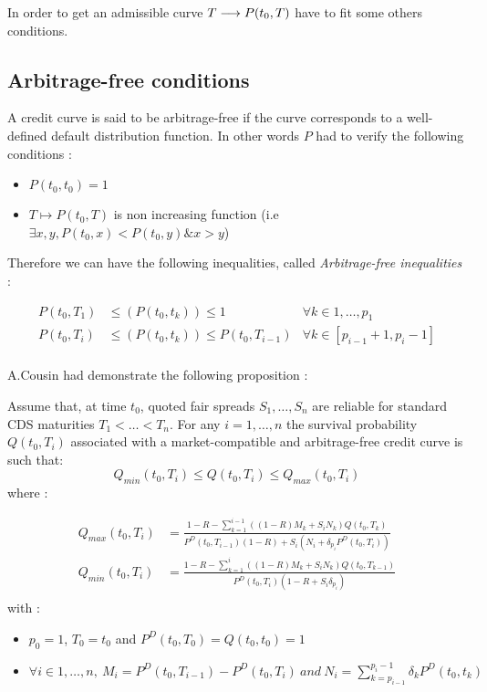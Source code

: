 In order to  get an admissible curve  $T \longrightarrow P(t_0,T)$ have to  fit some others
conditions. 

\subsection{Arbitrage-free conditions}
\label{sec:arbitr-free-cond}


\begin{de}
  A credit  curve is  said to be  arbitrage-free if the  curve corresponds  to a
  well-defined default distribution  function. In other words $P$  had to verify
  the following conditions :
  \begin{itemize}
  \item $P(t_0,t_0)=1$
  \item $T\longmapsto P(t_0,T)$ is non increasing function (i.e $\exists x,y, P(t_0,x)<P(t_0,y)\&x>y$)
  \end{itemize}
\end{de}

Therefore we can have  the following inequalities, called \textit{Arbitrage-free
  inequalities} :

\begin{align*}
  P(t_0,T_1) & \leq(P(t_0,t_k)) \leq 1 & \forall k \in 1,\dots,p_1 \\
  P(t_0,T_i) &\leq(P(t_0,t_k)) \leq P(t_0,T_{i-1}) & \forall k \in [p_{i-1}+1
  , p_i-1 ]\\
\end{align*}

A.Cousin had demonstrate the following proposition :
\begin{prop}
  Assume that, at  time $t_0$, quoted fair spreads  $S_1,\dots,S_n$ are reliable
  for  standard  CDS  maturities  $T_1<\dots<T_n.$  For  any  $i=1,\dots,n$  the
  survival  probability $Q(t_0,T_i)$  associated  with  a market-compatible  and
  arbitrage-free credit curve is such that:
  \[
  Q_{min}(t_0,T_i) \leq Q(t_0,T_i) \leq Q_{max}(t_0,T_i)
  \]
  where :

  \begin{eqnarray*}
    Q_{max}(t_0,T_i) & =\frac
    {1 - R - \sum^{i - 1}_{k=1}( (1 - R) M_k + S_i N_k) Q(t_0,T_{k})}
    {P^D(t_0,T_{i - 1})(1 - R) + S_i(N_i + \delta_{p_i}P^D(t_0,T_i))}\\
    Q_{min}(t_0,T_i) &  =\frac{1 - R  - \sum^i_{k=1}  ( (1 -  R) M_k +  S_i N_k)
      Q(t_0,T_{k -1})}{P^D(t_0,T_{i})(1 - R + S_i \delta_{p_i})}\\
  \end{eqnarray*}
with :
\begin{itemize}
\item $p_0=1$, $T_0=t_0$ and $P^D(t_0,T_0)=Q(t_0,t_0)=1$
\item $\forall  i \in 1,\dots,n,\ M_i=P^D(t_0,T_{i-1})-P^D(t_0,T_i)\  and\ N_i =
  \sum^{p_i-1}_{k=p_{i-1}} \delta_k P^D(t_0,t_k)$ 
\end{itemize}
\end{prop}

